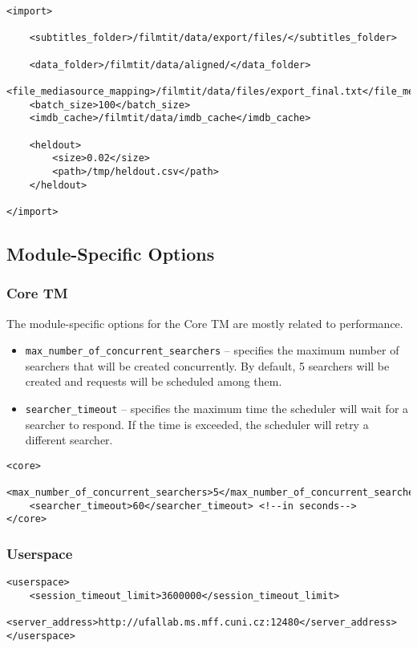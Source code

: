 \begin{lstlisting}
<import>

    <subtitles_folder>/filmtit/data/export/files/</subtitles_folder>

    <data_folder>/filmtit/data/aligned/</data_folder>
    <file_mediasource_mapping>/filmtit/data/files/export_final.txt</file_mediasource_mapping>
    <batch_size>100</batch_size>
    <imdb_cache>/filmtit/data/imdb_cache</imdb_cache>

    <heldout>
        <size>0.02</size>
        <path>/tmp/heldout.csv</path>
    </heldout>

</import>
\end{lstlisting}


\subsection{Module-Specific Options}

\subsubsection{Core TM}

The module-specific options for the Core TM are mostly related to performance.

\begin{itemize}
        \item \verb#max_number_of_concurrent_searchers# -- specifies the maximum number of searchers that will be created concurrently. By default, 5 searchers will be created and requests will be scheduled among them.
        \item \verb#searcher_timeout# -- specifies the maximum time the scheduler will wait for a searcher to respond. If the time is exceeded, the scheduler will retry a different searcher.
\end{itemize}

\begin{lstlisting}
<core>
    <max_number_of_concurrent_searchers>5</max_number_of_concurrent_searchers>
    <searcher_timeout>60</searcher_timeout> <!--in seconds-->
</core>
\end{lstlisting}


\subsubsection{Userspace}

\begin{lstlisting}
<userspace>
    <session_timeout_limit>3600000</session_timeout_limit>
    <server_address>http://ufallab.ms.mff.cuni.cz:12480</server_address>
</userspace>
\end{lstlisting}

